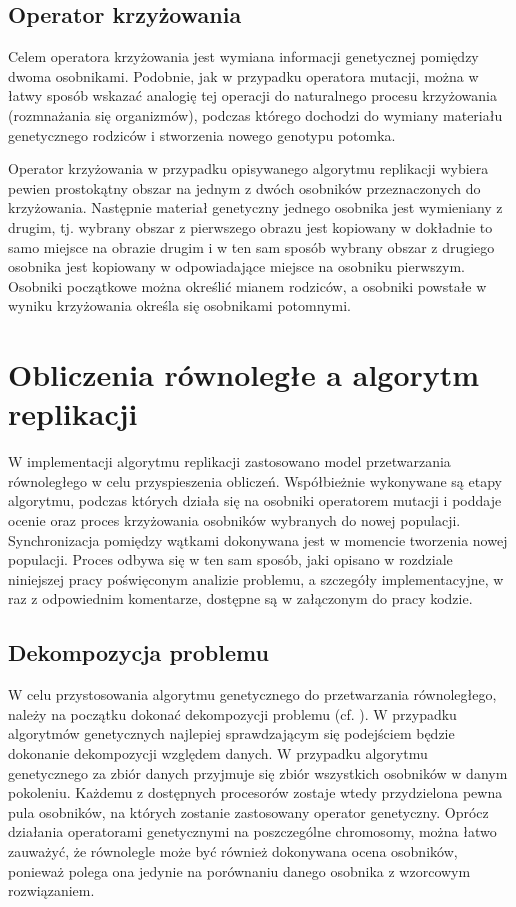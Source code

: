 \subsection{Operator krzyżowania}

Celem operatora krzyżowania jest wymiana informacji genetycznej pomiędzy dwoma osobnikami. Podobnie, jak w przypadku operatora mutacji, można w łatwy sposób wskazać analogię tej operacji do naturalnego procesu krzyżowania (rozmnażania się organizmów), podczas którego dochodzi do wymiany materiału genetycznego rodziców i stworzenia nowego genotypu potomka.

Operator krzyżowania w przypadku opisywanego algorytmu replikacji wybiera pewien prostokątny obszar na jednym z dwóch osobników przeznaczonych do krzyżowania. Następnie materiał genetyczny jednego osobnika jest wymieniany z drugim, tj. wybrany obszar z pierwszego obrazu jest kopiowany w dokładnie to samo miejsce na obrazie drugim i w ten sam sposób  wybrany obszar z drugiego osobnika jest kopiowany w odpowiadające miejsce na osobniku pierwszym. Osobniki początkowe można określić mianem rodziców, a osobniki powstałe w wyniku krzyżowania określa się osobnikami potomnymi.


\section{Obliczenia równoległe a algorytm replikacji}
\label{sec:concurrency_in_algorithm}
W implementacji algorytmu replikacji zastosowano model przetwarzania równoległego w celu przyspieszenia obliczeń. Współbieżnie wykonywane są etapy algorytmu, podczas których działa się na osobniki operatorem mutacji i poddaje ocenie oraz proces krzyżowania osobników wybranych do nowej populacji. Synchronizacja pomiędzy wątkami dokonywana jest w momencie tworzenia nowej populacji. Proces odbywa się w ten sam sposób, jaki opisano w rozdziale niniejszej pracy poświęconym analizie problemu, a szczegóły implementacyjne, w raz z odpowiednim komentarze, dostępne są w załączonym do pracy kodzie. 

\subsection{Dekompozycja problemu}
W celu przystosowania algorytmu genetycznego do przetwarzania równoległego, należy na początku dokonać dekompozycji problemu (cf. \cite{ObliczeniaRownolegle}). W przypadku algorytmów genetycznych najlepiej sprawdzającym się podejściem będzie dokonanie dekompozycji względem danych. W przypadku algorytmu genetycznego za zbiór danych przyjmuje się zbiór wszystkich osobników w danym pokoleniu. Każdemu z dostępnych procesorów zostaje wtedy przydzielona pewna pula osobników, na których zostanie zastosowany operator genetyczny. Oprócz działania operatorami genetycznymi na poszczególne chromosomy, można łatwo zauważyć, że równolegle może być również dokonywana ocena osobników, ponieważ polega ona jedynie na porównaniu danego osobnika z wzorcowym rozwiązaniem.

